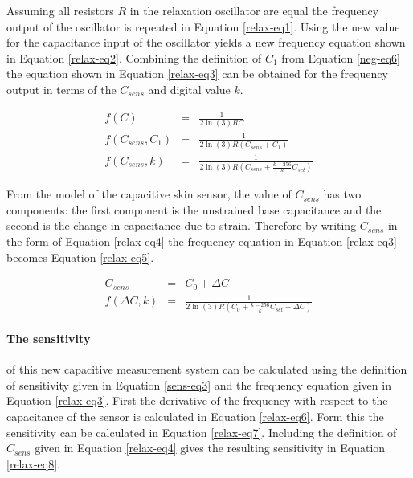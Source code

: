 Assuming all resistors $R$ in the relaxation oscillator are equal the frequency output of the oscillator is repeated in Equation \ref{relax-eq1}.  Using the new value for the capacitance input of the oscillator yields a new frequency equation shown in Equation \ref{relax-eq2}.  Combining the definition of $C_1$ from Equation \ref{neg-eq6} the equation shown in Equation \ref{relax-eq3} can be obtained for the frequency output in terms of the $C_{sens}$ and digital value $k$.

\begin{eqnarray}
	f(C)&=&\frac{1}{2\ln(3)RC}\label{relax-eq1}\\
	f(C_{sens},C_1)&=&\frac{1}{2\ln(3)R(C_{sens}+C_1)}\label{relax-eq2}\\
	f(C_{sens},k)&=&\frac{1}{2\ln(3)R(C_{sens}+\frac{k-256}{k}C_{set})}\label{relax-eq3}
\end{eqnarray}

From the model of the capacitive skin sensor, the value of $C_{sens}$ has two components: the first component is the unstrained base capacitance and the second is the change in capacitance due to strain.  Therefore by writing $C_{sens}$ in the form of Equation \ref{relax-eq4} the frequency equation in Equation \ref{relax-eq3} becomes Equation \ref{relax-eq5}.

\begin{eqnarray}
	C_{sens}&=&C_0+\Delta C\label{relax-eq4}\\
	f(\Delta C,k)&=&\frac{1}{2\ln(3)R(C_0+\frac{k-256}{k}C_{set}+\Delta C)}\label{relax-eq5}	
\end{eqnarray}

\paragraph{The sensitivity} of this new capacitive measurement system can be calculated using the definition of sensitivity given in Equation \ref{sens-eq3} and the frequency equation given in Equation \ref{relax-eq3}.  First the derivative of the frequency with respect to the capacitance of the sensor is calculated in Equation \ref{relax-eq6}.  Form this the sensitivity can be calculated in Equation \ref{relax-eq7}.  Including the definition of $C_{sens}$ given in Equation \ref{relax-eq4} gives the resulting sensitivity in Equation \ref{relax-eq8}.

